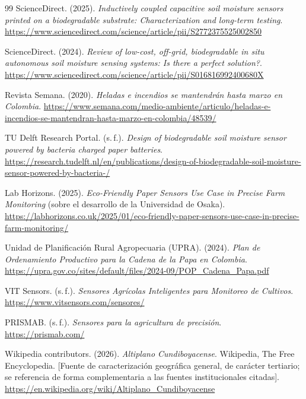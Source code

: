 \documentclass[11pt,a4paper]{article}
\begin{document}
\begin{thebibliography}{99}
 ScienceDirect. (2025). \textit{Inductively coupled capacitive soil moisture sensors printed on a biodegradable substrate: Characterization and long-term testing}. \url{https://www.sciencedirect.com/science/article/pii/S2772375525002850}

 ScienceDirect. (2024). \textit{Review of low-cost, off-grid, biodegradable in situ autonomous soil moisture sensing systems: Is there a perfect solution?}. \url{https://www.sciencedirect.com/science/article/pii/S016816992400680X}

 Revista Semana. (2020). \textit{Heladas e incendios se mantendrán hasta marzo en Colombia}. \url{https://www.semana.com/medio-ambiente/articulo/heladas-e-incendios-se-mantendran-hasta-marzo-en-colombia/48539/}

 TU Delft Research Portal. (s.\,f.). \textit{Design of biodegradable soil moisture sensor powered by bacteria charged paper batteries}. \url{https://research.tudelft.nl/en/publications/design-of-biodegradable-soil-moisture-sensor-powered-by-bacteria-/}

 Lab Horizons. (2025). \textit{Eco-Friendly Paper Sensors Use Case in Precise Farm Monitoring} (sobre el desarrollo de la Universidad de Osaka). \url{https://labhorizons.co.uk/2025/01/eco-friendly-paper-sensors-use-case-in-precise-farm-monitoring/}

 Unidad de Planificación Rural Agropecuaria (UPRA). (2024). \textit{Plan de Ordenamiento Productivo para la Cadena de la Papa en Colombia}. \url{https://upra.gov.co/sites/default/files/2024-09/POP_Cadena_Papa.pdf}

 VIT Sensors. (s.\,f.). \textit{Sensores Agrícolas Inteligentes para Monitoreo de Cultivos}. \url{https://www.vitsensors.com/sensores/}

 PRISMAB. (s.\,f.). \textit{Sensores para la agricultura de precisión}. \url{https://prismab.com/}

 Wikipedia contributors. (2026). \textit{Altiplano Cundiboyacense}. Wikipedia, The Free Encyclopedia. [Fuente de caracterización geográfica general, de carácter tertiario; se referencia de forma complementaria a las fuentes institucionales citadas]. \url{https://en.wikipedia.org/wiki/Altiplano_Cundiboyacense}

\end{thebibliography}
\end{document}

